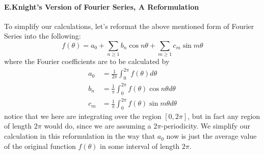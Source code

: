 \documentclass[11pt]{article}
\begin{document}
\paragraph{E.Knight's Version of Fourier Series, A Reformulation} To simplify our 
calculations, let's reformat the above mentioned form
of Fourier Series into the following:
\begin{equation*}
    f(\theta) = a_0 + \sum_{n\geq 1}b_n\cos n\theta + \sum_{m \geq 1}c_m\sin m \theta
\end{equation*}
where the Fourier coefficients are to be calculated by
\begin{align*}
    a_0 &= \frac{1}{2\pi}\int_{0}^{2\pi}f(\theta)d\theta \\
    b_n &= \frac{1}{\pi}\int_{0}^{2\pi}f(\theta)\cos n\theta d\theta \\
    c_m &= \frac{1}{\pi}\int_{0}^{2\pi}f(\theta)\sin m\theta d\theta 
\end{align*}
notice that we here are integrating over the region $[0, 2\pi]$, but in fact
any region of length $2\pi$ would do, since we are assuming a $2\pi$-periodicity.
We simplify our calculation in this reformulation in the way that $a_0$ now is
just the average value of the original function $f(\theta)$ in some interval
of length $2\pi$.
\end{document}
